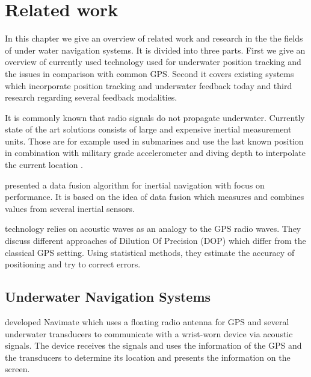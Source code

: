 %

\chapter{Related work}
\label{relatedwork}

In this chapter we give an overview of related work and research in the the fields of under water navigation systems. 
It is divided into three parts.
First we give an overview of currently used technology used for underwater position tracking and the issues in comparison with common GPS.
Second it covers existing systems which incorporate position tracking and underwater feedback today and third research regarding several feedback modalities. 

It is commonly known that radio signals do not propagate underwater.
Currently state of the art solutions consists of large and expensive inertial measurement units. 
Those are for example used in submarines and use the last known position in combination with military grade accelerometer and diving depth to interpolate the current location \citep{meyer}.

\cite{Rossi_Performance} presented a data fusion algorithm for inertial navigation with focus on performance.
It is based on the idea of data fusion which measures and combines values from several inertial sensors.

\cite{Taraldsen_UnderwaterGPS} technology relies on acoustic waves as an analogy to the GPS radio waves.
They discuss different approaches of Dilution Of Precision (DOP) which differ from the classical GPS setting.
Using statistical methods, they estimate the accuracy of positioning and try to correct errors.


\section{Underwater Navigation Systems}

\cite{navimate} developed Navimate which uses a floating radio antenna for GPS and several underwater transducers to communicate with a wrist-worn device via acoustic signals. 
The device receives the signals and uses the information of the GPS and the transducers to determine its location and presents the information on the screen. 

